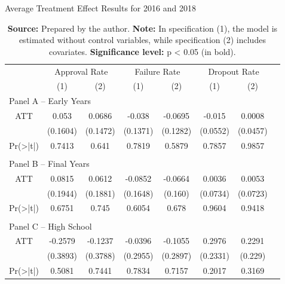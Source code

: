 \begin{table}[htbp]
    \centering
    \caption{Average Treatment Effect Results for 2016 and 2018}
    \label{tab:att_2016_2018}%
        \begin{tabular}{cccccccc}
        \toprule
         & \multicolumn{2}{c}{Approval Rate} & \multicolumn{2}{c}{Failure Rate} & \multicolumn{2}{c}{Dropout Rate} \\
         & (1) & (2) & (1) & (2) & (1) & (2) \\
        \midrule
        \multicolumn{7}{l}{Panel A – Early Years} \\
        ATT       & 0.053 & 0.0686 & -0.038 & -0.0695 & -0.015 & 0.0008 \\
                  & (0.1604) & (0.1472) & (0.1371) & (0.1282) & (0.0552) & (0.0457) \\
        Pr(>|t|)  & 0.7413 & 0.641 & 0.7819 & 0.5879 & 0.7857 & 0.9857 \\
        
        \\[-1.5ex]
        \multicolumn{7}{l}{Panel B – Final Years} \\
        ATT       & 0.0815 & 0.0612 & -0.0852 & -0.0664 & 0.0036 & 0.0053 \\
                  & (0.1944) & (0.1881) & (0.1648) & (0.160) & (0.0734) & (0.0723) \\
        Pr(>|t|)  & 0.6751 & 0.745 & 0.6054 & 0.678 & 0.9604 & 0.9418 \\
        
        \\[-1.5ex]
        \multicolumn{7}{l}{Panel C – High School} \\
        ATT       & -0.2579 & -0.1237 & -0.0396 & -0.1055 & 0.2976 & 0.2291 \\
                  & (0.3893) & (0.3788) & (0.2955) & (0.2897) & (0.2331) & (0.229) \\
        Pr(>|t|)  & 0.5081 & 0.7441 & 0.7834 & 0.7157 & 0.2017 & 0.3169 \\
        
        \bottomrule
        \end{tabular}%
\caption*{\footnotesize\textbf{Source:} Prepared by the author. \textbf{Note:} In specification (1), the model is estimated without control variables, while specification (2) includes covariates. \textbf{Significance level:} p < 0.05 (in bold).}
\end{table}